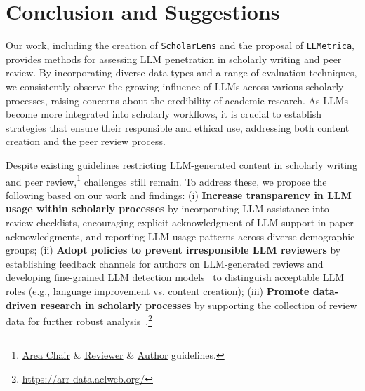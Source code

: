 \section{Conclusion and Suggestions}

Our work, including the creation of \texttt{ScholarLens} and the proposal of \texttt{LLMetrica}, provides methods for assessing LLM penetration in scholarly writing and peer review. By incorporating diverse data types and a range of evaluation techniques, we consistently observe the growing influence of LLMs across various scholarly processes, raising concerns about the credibility of academic research. As LLMs become more integrated into scholarly workflows, it is crucial to establish strategies that ensure their responsible and ethical use, addressing both content creation and the peer review process. 

Despite existing guidelines restricting LLM-generated content in scholarly writing and peer review,\footnote{\href{https://aclrollingreview.org/acguidelines\#-task-3-checking-review-quality-and-chasing-missing-reviewers}{Area Chair} \&  \href{https://aclrollingreview.org/reviewerguidelines\#q-can-i-use-generative-ai}{Reviewer} \& \href{https://www.aclweb.org/adminwiki/index.php/ACL_Policy_on_Publication_Ethics\#Guidelines_for_Generative_Assistance_in_Authorship}{Author} guidelines.} challenges still remain. 
To address these, we propose the following based on our work and findings: 
(i) \textbf{Increase transparency in LLM usage within scholarly processes} by incorporating LLM assistance into review checklists, encouraging explicit acknowledgment of LLM support in paper acknowledgments, and 
reporting LLM usage patterns across diverse demographic groups;
(ii) \textbf{Adopt policies to prevent irresponsible LLM reviewers} by establishing feedback channels for authors on LLM-generated reviews and developing fine-grained LLM detection models~\cite{abassy-etal-2024-llm, cheng2024beyond, artemova2025beemobenchmarkexperteditedmachinegenerated} to distinguish acceptable LLM roles (e.g., language improvement vs. content creation);
(iii) \textbf{Promote data-driven research in scholarly processes} by supporting the collection of review data for further robust analysis~\cite{dycke-etal-2022-yes}.\footnote{\url{https://arr-data.aclweb.org/}}


 

